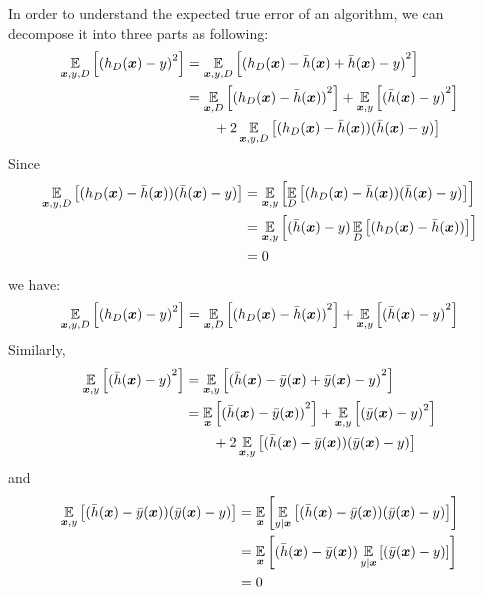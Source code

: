 In order to understand the expected true error of an algorithm, we can decompose it into three parts as
following:
\begin{align*}
    \E_{\V{x}, y, D}\left[{(h_D(\V{x}) - y)}^2\right] &= \E_{\V{x}, y, D} \left[{(h_D(\V{x}) - \bar{h}(\V{x})
    + \bar{h}(\V{x}) - y)}^2 \right] \\
    &= \E_{\V{x}, D} \left[{(h_D(\V{x}) - \bar{h}(\V{x}))}^2\right] +
    \E_{\V{x}, y}\left[{(\bar{h}(\V{x}) - y)}^2\right]\\
    &\quad\quad + 2\E_{\V{x}, y, D}\left[{(h_D(\V{x}) - \bar{h}(\V{x}))(\bar{h}(\V{x}) - y)}\right]\\
\end{align*}
Since
\begin{align*}
    \E_{\V{x}, y, D}\left[(h_D(\V{x}) - \bar{h}(\V{x}))(\bar{h}(\V{x}) - y)\right] &=
    \E_{\V{x}, y}\left[\E_D\left[(h_D(\V{x}) - \bar{h}(\V{x}))(\bar{h}(\V{x}) - y)\right]\right] \\
    &= \E_{\V{x}, y}\left[(\bar{h}(\V{x}) - y) \E_D\left[(h_D(\V{x}) - \bar{h}(\V{x}))\right]\right] \\
    &= 0
\end{align*}
we have:
\begin{equation}\label{bias-variance:1}
    \E_{\V{x}, y, D}\left[{(h_D(\V{x}) - y)}^2\right] = \E_{\V{x}, D} \left[{(h_D(\V{x}) -
    \bar{h}(\V{x}))}^2\right] + \E_{\V{x}, y}\left[{(\bar{h}(\V{x}) - y)}^2\right]
\end{equation}
Similarly,
\begin{align*}
    \E_{\V{x}, y}\left[{(\bar{h}(\V{x}) - y)}^2\right] &= \E_{\V{x}, y}\left[{(\bar{h}(\V{x}) - \bar{y}(\V{x})
    + \bar{y}(\V{x}) - y)}^2\right]\\
    &= \E_{\V{x}}\left[{(\bar{h}(\V{x}) - \bar{y}(\V{x}))}^2\right] +
    \E_{\V{x}, y}\left[{(\bar{y}(\V{x}) - y)}^2\right] \\
    &\quad\quad + 2\E_{\V{x}, y}\left[(\bar{h}(\V{x}) - \bar{y}(\V{x}))(\bar{y}(\V{x}) - y)\right]
\end{align*}
and
\begin{align*}
    \E_{\V{x}, y}\left[(\bar{h}(\V{x}) - \bar{y}(\V{x}))(\bar{y}(\V{x}) - y)\right] &=
    \E_{\V{x}}\left[\E_{y|\V{x}}\left[(\bar{h}(\V{x}) - \bar{y}(\V{x}))(\bar{y}(\V{x}) - y)\right]\right]\\
    &= \E_{\V{x}}\left[(\bar{h}(\V{x}) - \bar{y}(\V{x})) \E_{y|\V{x}}\left[(\bar{y}(\V{x}) - y)\right]\right]\\
    &= 0
\end{align*}
